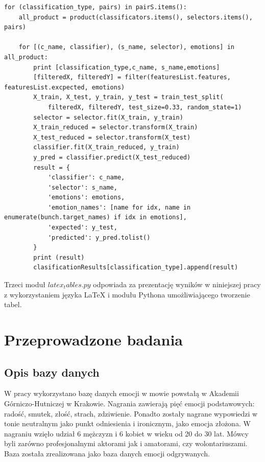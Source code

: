 \documentclass[a4paper,12pt,twoside,openany]{report}
\begin{document}
\begin{lstlisting}[caption={Klasyfikacja emocji},label={lst:classification}]
for (classification_type, pairs) in pairS.items():
    all_product = product(classificators.items(), selectors.items(), pairs)

    for [(c_name, classifier), (s_name, selector), emotions] in all_product:
        print [classification_type,c_name, s_name,emotions]
        [filteredX, filteredY] = filter(featuresList.features, featuresList.excpected, emotions)
        X_train, X_test, y_train, y_test = train_test_split(
            filteredX, filteredY, test_size=0.33, random_state=1)
        selector = selector.fit(X_train, y_train)
        X_train_reduced = selector.transform(X_train)
        X_test_reduced = selector.transform(X_test)
        classifier.fit(X_train_reduced, y_train)
        y_pred = classifier.predict(X_test_reduced)
        result = {
            'classifier': c_name,
            'selector': s_name,
            'emotions': emotions,
            'emotion_names': [name for idx, name in enumerate(bunch.target_names) if idx in emotions],
            'expected': y_test,
            'predicted': y_pred.tolist()
        }
        print (result)
        clasificationResults[classification_type].append(result)
\end{lstlisting}

Trzeci moduł $latex_tables.py$ odpowiada za prezentację wyników w niniejszej pracy z wykorzystaniem języka \LaTeX{} i modułu Pythona umożliwiającego tworzenie tabel. 
\chapter{Przeprowadzone badania}
\section{Opis bazy danych}\label{sec:opis_bazy_danych}
W pracy wykorzystano bazę danych emocji w mowie powstałą w Akademii Górniczo-Hutniczej w Krakowie.
Nagrania zawierają pięć emocji podstawowych: radość, smutek, złość, strach, zdziwienie.
Ponadto zostały nagrane wypowiedzi w tonie neutralnym jako punkt odniesienia i ironicznym, jako emocja złożona.
W nagraniu wzięło udział 6 mężczyzn i 6 kobiet w wieku od 20 do 30 lat. 
Mówcy byli zarówno profesjonalnymi aktorami jak i amatorami, czy wolontariuszami.
Baza została zrealizowana jako baza danych emocji odgrywanych. 
\end{document}
